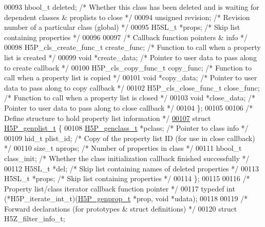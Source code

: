 \begin{DoxyCode}
00093     hbool\_t    deleted;    \textcolor{comment}{/* Whether this class has been deleted and is waiting for dependent classes &
       proplists to close */}
00094     \textcolor{keywordtype}{unsigned}   revision;   \textcolor{comment}{/* Revision number of a particular class (global) */}
00095     H5SL\_t    *props;      \textcolor{comment}{/* Skip list containing properties */}
00096 
00097     \textcolor{comment}{/* Callback function pointers & info */}
00098     H5P\_cls\_create\_func\_t create\_func;  \textcolor{comment}{/* Function to call when a property list is created */}
00099     \textcolor{keywordtype}{void} *create\_data;     \textcolor{comment}{/* Pointer to user data to pass along to create callback */}
00100     H5P\_cls\_copy\_func\_t copy\_func;      \textcolor{comment}{/* Function to call when a property list is copied */}
00101     \textcolor{keywordtype}{void} *copy\_data;       \textcolor{comment}{/* Pointer to user data to pass along to copy callback */}
00102     H5P\_cls\_close\_func\_t close\_func;    \textcolor{comment}{/* Function to call when a property list is closed */}
00103     \textcolor{keywordtype}{void} *close\_data;      \textcolor{comment}{/* Pointer to user data to pass along to close callback */}
00104 \};
00105 
00106 \textcolor{comment}{/* Define structure to hold property list information */}
\hyperlink{struct_h5_p__genplist__t}{00107} \textcolor{keyword}{struct }\hyperlink{struct_h5_p__genplist__t}{H5P\_genplist\_t} \{
00108     \hyperlink{struct_h5_p__genclass__t}{H5P\_genclass\_t} *pclass; \textcolor{comment}{/* Pointer to class info */}
00109     hid\_t   plist\_id;   \textcolor{comment}{/* Copy of the property list ID (for use in close callback) */}
00110     \textcolor{keywordtype}{size\_t}  nprops;     \textcolor{comment}{/* Number of properties in class */}
00111     hbool\_t class\_init; \textcolor{comment}{/* Whether the class initialization callback finished successfully */}
00112     H5SL\_t *del;        \textcolor{comment}{/* Skip list containing names of deleted properties */}
00113     H5SL\_t *props;      \textcolor{comment}{/* Skip list containing properties */}
00114 \};
00115 
00116 \textcolor{comment}{/* Property list/class iterator callback function pointer */}
00117 \textcolor{keyword}{typedef} int (*H5P\_iterate\_int\_t)(\hyperlink{struct_h5_p__genprop__t}{H5P\_genprop\_t} *prop, \textcolor{keywordtype}{void} *udata);
00118 
00119 \textcolor{comment}{/* Forward declarations (for prototypes & struct definitions) */}
00120 \textcolor{keyword}{struct }H5Z\_filter\_info\_t;

\end{DoxyCode}
